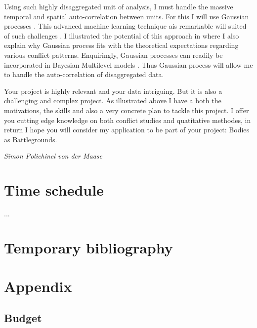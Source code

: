 \documentclass[a4paper]{article}
\begin{document}
Using such highly disaggregated unit of analysis, I must handle the massive temporal and spatial auto-correlation between units. For this I will use Gaussian processes \cite{williams2006gaussian}. This advanced machine learning technique ais remarkable will suited of such challenges \citep{Gelman_2013, gelfand2016spatial, Mcelreath_2018, SPECIALE}. I illustrated the potential of this approach in \cite{SPECIALE} where I also explain why Gaussian process fits with the theoretical expectations regarding various conflict patterns\citep[22-27]{SPECIALE}. Enquiringly, Gaussian processes can readily be incorporated in Bayesian Multilevel models \citep[410-419]{Mcelreath_2018}. Thus Gaussian process will allow me to handle the auto-correlation of disaggregated data.\par



Your project is highly relevant and your data intriguing. But it is also a challenging and complex project. As illustrated above I have a both the motivations, the skills and also a very concrete plan to tackle this project. I offer you cutting edge knowledge on both conflict studies and quatitative methodes, in return I hope you will consider my application to be part of your project: Bodies as Battlegrounds.\par
\hfill\par
\hfill\emph{Simon Polichinel von der Maase}



\pagebreak

\section{Time schedule} 
...

\section{Temporary bibliography}
 


\pagebreak
\section{Appendix}

\subsection{Budget}
\end{document}
